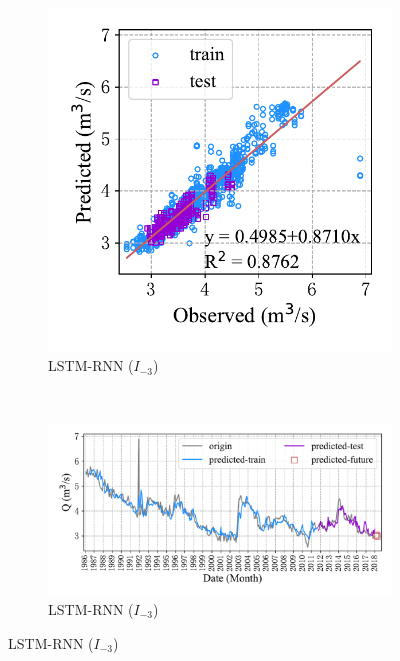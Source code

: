 \begin{figure}[!htbp]
\begin{subfigure}[b]{0.615\textwidth}
  \end{subfigure}
  \\
  \begin{subfigure}[b]{0.305\textwidth}
    \includegraphics[width=\textwidth]{Img/chap4_spr/spr_scatter_in_3_out_3_lstm.pdf}
    \vspace{-1.2cm}
    \caption{LSTM-RNN ($I_{-3}$)}
    \label{fig:spr_scatter_in_3_out_3_lstm}
  \end{subfigure}
  ~
  \begin{subfigure}[b]{0.615\textwidth}
    \includegraphics[width=\textwidth]{Img/chap4_spr/spr_series_in_3_out_3_lstm.pdf}
    \vspace{-1.2cm}
    \caption{LSTM-RNN ($I_{-3}$)}
    \label{fig:spr_series_in_3_out_3_lstm}

\end{subfigure}
\end{figure}
